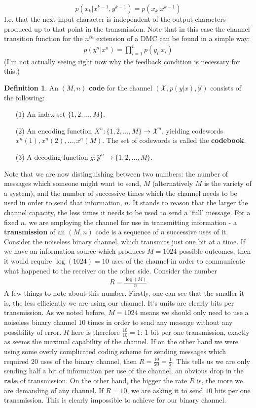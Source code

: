 \documentclass{article}
\theoremstyle{definition}
\newtheorem{definition}{Definition}[section]
\theoremstyle{plain}
\begin{document}
\[ p(x_k|x^{k-1},y^{k-1}) = p(x_k|x^{k-1}) \]
I.e. that the next input character is independent of the output characters produced up to that point in the transmission. Note that in this case the channel transition function for the $n^{th}$ extension of a DMC can be found in a simple way:
\begin{align}
	p(y^n|x^n) = \prod_{i=1}^n p(y_i|x_i)
\end{align}
(I'm not actually seeing right now why the feedback condition is necessary for this.) \\
\begin{definition}
	An $(M,n)$ \textbf{code} for the channel $(\mathcal{X},p(y|x),\mathcal{Y})$ consists of the following:
	\begin{itemize}
		\item[(1)] An index set $\{1,2,\ldots,M\}$.
		\item[(2)] An encoding function $X^n:\{1,2,\ldots,M\} \to \mathcal{X}^n$, yielding codewords $x^n(1),x^n(2),\ldots,x^n(M)$. The set of codewords is called the \textbf{codebook}. 
		\item[(3)] A decoding function $g:\mathcal{Y}^n \to \{1,2,\ldots,M\}$. 
	\end{itemize}
\end{definition}
Note that we are now distinguishing between two numbers: the number of messages which someone might want to send, $M$ (alternatively $M$ is the variety of a system), and the number of successive times which the channel needs to be used in order to send that information, $n$. It stands to reason that the larger the channel capacity, the less times it needs to be used to send a `full' message. For a fixed $n$, we are employing the channel for use in transmitting information - a \textbf{transmission} of an $(M,n)$ code is a sequence of $n$ successive uses of it. Consider the noiseless binary channel, which transmits just one bit at a time. If we have an information source which produces $M=1024$ possible outcomes, then it would require $\log(1024) = 10$ uses of the channel in order to communicate what happened to the receiver on the other side. Consider the number 
\begin{align}
	R = \frac{\log(M)}{n}
\end{align} 
A few things to note about this number. Firstly, one can see that the smaller it is, the less efficiently we are using our channel. It's units are clearly bits per transmission. As we noted before, $M=1024$ means we should only need to use a noiseless binary channel $10$ times in order to send any message without any possibility of error. $R$ here is therefore $\frac{10}{10}=1$: $1$ bit per one transmission, exactly as seems the maximal capability of the channel. If on the other hand we were using some overly complicated coding scheme for sending messages which required $20$ uses of the binary channel, then $R = \frac{10}{20} = \frac{1}{2}$. This tells us we are only sending half a bit of information per use of the channel, an obvious drop in the \textbf{rate} of transmission. On the other hand, the bigger the rate $R$ is, the more we are demanding of any channel. If $R = 10$, we are asking it to send $10$ bits per one transmission. This is clearly impossible to achieve for our binary channel. \par 
\end{document}
